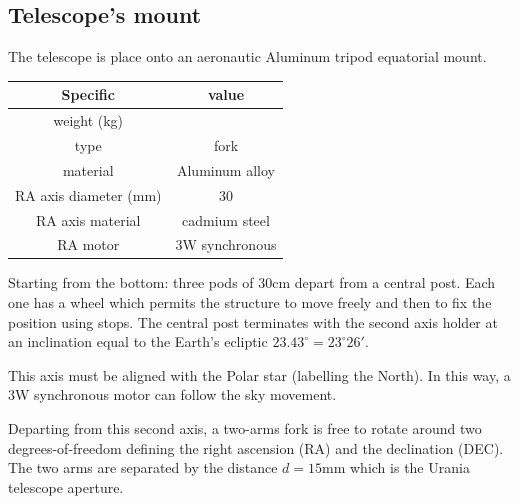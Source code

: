\documentclass{article}
\begin{document}
\begin{multicols}{2}
        \subsection{Telescope's mount}
        The telescope is place onto an aeronautic Aluminum tripod equatorial mount.
        \\
        \begin{minipage}{.5\textwidth}
            \centering
            \begin{tabular}{cc}
                Specific & value \\
                \hline
                weight (kg) & \\
                type & fork \\
                material & Aluminum alloy \\
                RA axis diameter (mm) & 30 \\
                RA axis material & cadmium steel \\
                RA motor & 3W synchronous \\
                \hline
            \end{tabular}
            \label{tab:mount}
        \end{minipage}

        Starting from the bottom: three pods of 30cm depart from a central post. Each one has a wheel which permits the structure to move freely and then to fix the position using stops.
        The central post terminates with the second axis holder at an inclination equal to the Earth's ecliptic \(23.43^{\circ} = 23^{\circ} 26'\).

        This axis must be aligned with the Polar star (labelling the North).
        In this way, a 3W synchronous motor can follow the sky movement.

        Departing from this second axis, a two-arms fork is free to rotate around two degrees-of-freedom defining the right ascension (RA) and the declination (DEC).
        The two arms are separated by the distance \(d = 15\)mm which is the Urania telescope aperture.

\end{multicols}
\end{document}
